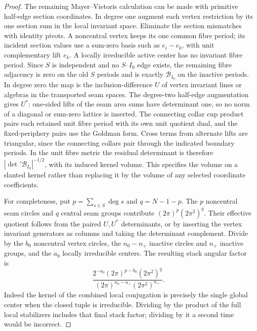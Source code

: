 \begin{proof}
The remaining Mayer--Vietoris calculation can be made with primitive
half-edge section coordinates. In degree one augment each vertex
restriction by its one section sum in the local invariant space.
Eliminate the section mismatches with identity pivots. A noncentral
vertex keeps its one common fibre period; its incident section values
use a sum-zero basis such as \(e_i-e_k\), with unit complementary lift
\(e_k\). A locally irreducible active center has no invariant fibre
period. Since \(S\) is independent and no \(S\)--\(I_0\) edge exists, the
remaining fibre adjacency is zero on the old \(S\) periods and is
exactly \(\mathcal B_{I_0}\) on the inactive periods. In degree zero the
map is the inclusion-difference \(U\) of vertex invariant lines or
algebras in the transported seam spaces. The degree-two half-edge
augmentation gives \(U^*\): one-sided lifts of the seam area sums have
determinant one, so no norm of a diagonal or sum-zero lattice is
inserted. The connecting collar cup product pairs each retained unit
fibre period with its own unit quotient dual, and the fixed-periphery
pairs use the Goldman form. Cross terms from alternate lifts are
triangular, since the connecting collars pair through the indicated
boundary periods. In the unit fibre metric the residual determinant is
therefore \(|\det{}'\mathcal B_{I_0}|^{-1/2}\), with its induced kernel
volume. This specifies the volume on a slanted kernel rather than
replacing it by the volume of any selected coordinate coefficients.

For completeness, put \(p=\sum_{s\in S}\deg s\) and \(q=N-1-p\). The
\(p\) noncentral seam circles and \(q\) central seam groups contribute
\((2\pi)^p(2\pi^2)^q\). Their effective quotient follows from the paired
\(U,U^*\) determinants, or by inserting the vertex invariant generators
as columns and taking the determinant complement. Divide by the
\(b_0\) noncentral vertex circles,
the \(n_0-n_+\) inactive circles and \(n_+\) inactive groups, and the
\(a_0\) locally irreducible centers.
The resulting stack angular factor is
\[
 \frac{2^{-a_0}(2\pi)^{p-b_0}(2\pi^2)^q}
      {(2\pi)^{n_0-n_+}(2\pi^2)^{n_+}}.
\]
Indeed the kernel of the combined local conjugation is precisely the
single global center when the closed tuple is irreducible. Dividing by
the product of the full local stabilizers includes that final stack
factor; dividing by it a second time would be incorrect.


\end{proof}
